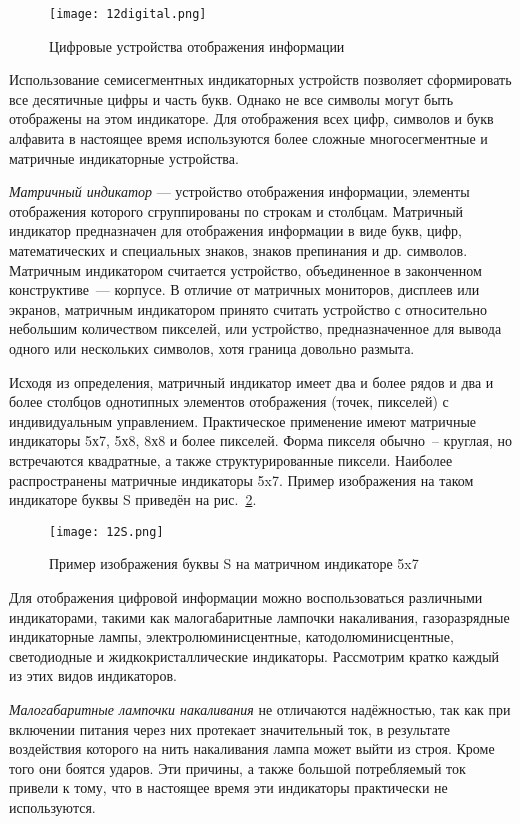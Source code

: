 \begin{figure}[h!]
	\caption{ Цифровые устройства отображения информации }
	\texttt{[image: 12digital.png]}
	\label{pic:12digital}
\end{figure}

Использование семисегментных индикаторных устройств позволяет сформировать все десятичные цифры и часть букв. Однако не все символы могут быть отображены на этом индикаторе. Для отображения всех цифр, символов и букв алфавита в настоящее время используются более сложные многосегментные и матричные индикаторные устройства. 

\textit{Матричный индикатор} --- устройство отображения информации, элементы отображения которого сгруппированы по строкам и столбцам. Матричный индикатор предназначен для отображения информации в виде букв, цифр, математических и специальных знаков, знаков препинания и др. символов. Матричным индикатором считается устройство, объединенное в законченном конструктиве~--- корпусе. В отличие от матричных мониторов, дисплеев или экранов, матричным индикатором принято считать устройство с относительно небольшим количеством пикселей, или устройство, предназначенное для вывода одного или нескольких символов, хотя граница довольно размыта. 

Исходя из определения, матричный индикатор имеет два и более рядов и два и более столбцов однотипных элементов отображения (точек, пикселей) с индивидуальным управлением. Практическое применение имеют матричные индикаторы 5х7, 5х8, 8х8 и более пикселей. Форма пикселя обычно~-- круглая, но встречаются квадратные, а также структурированные пиксели. Наиболее распространены матричные индикаторы 5x7. Пример изображения на таком индикаторе буквы S приведён на рис.~\ref{pic:12S}.

\begin{figure}[h!]
	\caption{ Пример изображения буквы S на матричном индикаторе 5x7 }
	\texttt{[image: 12S.png]}
	\label{pic:12S}
\end{figure}

Для отображения цифровой информации можно воспользоваться различными индикаторами, такими как малогабаритные лампочки накаливания, газоразрядные индикаторные лампы, электролюминисцентные, катодолюминисцентные, светодиодные и жидкокристаллические индикаторы. Рассмотрим кратко каждый из этих видов индикаторов.

\textit{Малогабаритные лампочки накаливания} не отличаются надёжностью, так как при включении питания через них протекает значительный ток, в результате воздействия которого на нить накаливания лампа может выйти из строя. Кроме того они боятся ударов. Эти причины, а также большой потребляемый ток привели к тому, что в настоящее время эти индикаторы практически не используются.

